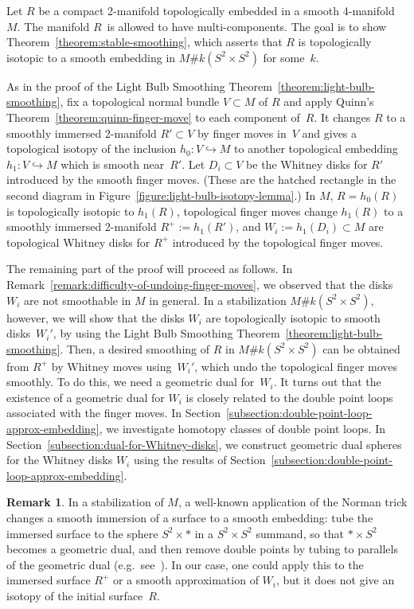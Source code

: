 \documentclass[11pt]{amsart}
\theoremstyle{definition}
\newtheorem{remark}[theorem]{Remark}
\theoremstyle{theorem-giventitle}
\theoremstyle{definition-giventitle}
\numberwithin{equation}{section}
\begin{document}
Let $R$ be a compact 2-manifold topologically embedded in a smooth 4-manifold~$M$.
The manifold $R$~is allowed to have multi-components.
The goal is to show Theorem~\ref{theorem:stable-smoothing}, which asserts that $R$ is topologically isotopic to a smooth embedding in $M\#k(S^{2}\times S^{2})$ for some~$k$.

As in the proof of the Light Bulb Smoothing Theorem~\ref{theorem:light-bulb-smoothing}, fix a topological normal bundle $V\subset M$ of $R$ and apply Quinn's Theorem~\ref{theorem:quinn-finger-move} to each component of~$R$.
It changes $R$ to a smoothly immersed 2-manifold $R'\subset V$ by finger moves in~$V$ and gives a topological isotopy of the inclusion $h_0\colon V\hookrightarrow M$ to another topological embedding $h_1\colon V\hookrightarrow M$ which is smooth near~$R'$.
Let $D_i\subset V$ be the Whitney disks for $R'$ introduced by the smooth finger moves.
(These are the hatched rectangle in the second diagram in Figure~\ref{figure:light-bulb-isotopy-lemma}.)
In $M$, $R=h_0(R)$ is topologically isotopic to $h_1(R)$, topological finger moves change $h_1(R)$ to a smoothly immersed 2-manifold $R^+ := h_1(R')$, and $W_i := h_1(D_i) \subset M$ are topological Whitney disks for $R^+$ introduced by the topological finger moves.

The remaining part of the proof will proceed as follows.
In Remark~\ref{remark:difficulty-of-undoing-finger-moves}, we observed that the disks $W_i$ are not smoothable in $M$ in general.
In a stabilization $M \# k(S^2\times S^2)$, however, we will show that the disks $W_i$ are topologically isotopic to smooth disks~$W_i'$, by using the Light Bulb Smoothing Theorem~\ref{theorem:light-bulb-smoothing}\@.
Then, a desired smoothing of $R$ in $M \# k(S^2\times S^2)$ can be obtained from $R^+$ by Whitney moves using~$W_i'$, which undo the topological finger moves smoothly.
To do this, we need a geometric dual for~$W_i$.
It turns out that the existence of a geometric dual for $W_i$ is closely related to the double point loops associated with the finger moves.
In Section~\ref{subsection:double-point-loop-approx-embedding}, we investigate homotopy classes of double point loops.
In Section~\ref{subsection:dual-for-Whitney-disks}, we construct geometric dual spheres for the Whitney disks $W_i$ using the results of Section~\ref{subsection:double-point-loop-approx-embedding}.

\begin{remark}
  In a stabilization of $M$, a well-known application of the Norman trick changes a smooth immersion of a surface to a smooth embedding:
  tube the immersed surface to the sphere $S^2\times *$ in a $S^2\times S^2$ summand, so that $*\times S^2$ becomes a geometric dual, and then remove double points by tubing to parallels of the geometric dual (e.g.\ see~\cite[1.9]{Freedman-Quinn:1990-1}).
  In our case, one could apply this to the immersed surface $R^+$ or a smooth approximation of $W_i$, but it does not give an isotopy of the initial surface~$R$.
\end{remark}
\end{document}
